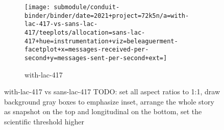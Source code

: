 \begin{figure*}[h]
    \begin{subfigure}[b]{\textwidth}
      \centering
      \texttt{[image: submodule/conduit-binder/binder/date=2021+project=72k5n/a=with-lac-417-vs-sans-lac-417/teeplots/allocation=sans-lac-417+hue=instrumentation+viz=beleaguerment-facetplot+x=messages-received-per-second+y=messages-sent-per-second+ext=]}
      \caption{with-lac-417}
      \label{fig:TODO}
    \end{subfigure}

    \caption{with-lac-417 vs sans-lac-417 TODO: set all aspect ratios to 1:1, draw background gray boxes to emphasize inset, arrange the whole story as snapshot on the top and longitudinal on the bottom, set the scientific threshold higher}
    \label{fig:with-lac-417-vs-sans-lac-417-summary}
  \end{figure*}
